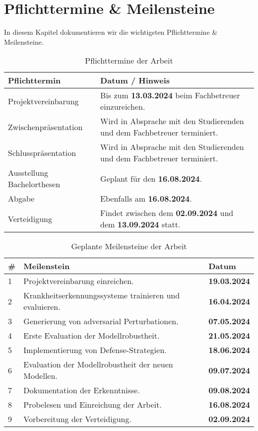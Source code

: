 \section{Pflichttermine \& Meilensteine}
In diesem Kapitel dokumentieren wir die wichtigsten Pflichttermine \& Meilensteine.
\begin{table}[ht]
    \centering
    \begin{tabular}{@{}p{5cm}p{10cm}@{}}
        \toprule
        \textbf{Pflichttermin} & \textbf{Datum / Hinweis} \\
        \midrule
        Projektvereinbarung & Bis zum \textbf{13.03.2024} beim Fachbetreuer einzureichen. \\
        \midrule
        Zwischenpräsentation & Wird in Absprache mit den Studierenden und dem Fachbetreuer terminiert. \\
        \midrule
        Schlusspräsentation & Wird in Absprache mit den Studierenden und dem Fachbetreuer terminiert. \\
        \midrule
        Ausstellung Bachelorthesen & Geplant für den \textbf{16.08.2024}. \\
        \midrule
        Abgabe & Ebenfalls am \textbf{16.08.2024}. \\
        \midrule
        Verteidigung & Findet zwischen dem \textbf{02.09.2024} und dem \textbf{13.09.2024} statt. \\
        \bottomrule
    \end{tabular}
    \caption{Pflichttermine der Arbeit}
\end{table}

\begin{table}[ht]
    \centering
    \begin{tabular}{@{}p{0.5cm}p{10cm}p{2.5cm}@{}}
        \toprule
        \textbf{\#} & \textbf{Meilenstein} & \textbf{Datum} \\
        \midrule
        1 & Projektvereinbarung einreichen. & \textbf{19.03.2024} \\
        \midrule
        2 & Krankheitserkennungssysteme trainieren und evaluieren. & \textbf{16.04.2024} \\
        \midrule
        3 & Generierung von adversarial Perturbationen. & \textbf{07.05.2024}\\
        \midrule
        4 & Erste Evaluation der Modellrobustheit. & \textbf{21.05.2024} \\
        \midrule
        5 & Implementierung von Defense-Strategien. & \textbf{18.06.2024} \\
        \midrule
        6 & Evaluation der Modellrobustheit der neuen Modellen. & \textbf{09.07.2024} \\
        \midrule
        7 & Dokumentation der Erkenntnisse. & \textbf{09.08.2024} \\
        \midrule
        8 & Probelesen und Einreichung der Arbeit. & \textbf{16.08.2024} \\
        \midrule
        9 & Vorbereitung der Verteidigung. & \textbf{02.09.2024} \\
        \bottomrule
    \end{tabular}
    \caption{Geplante Meilensteine der Arbeit}
\end{table}
